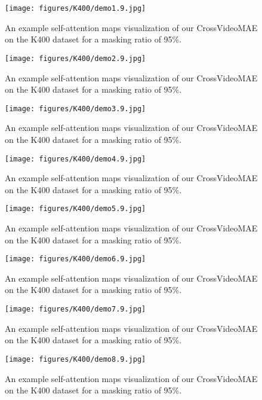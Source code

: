 \begin{figure}[h!]
\centering
\texttt{[image: figures/K400/demo1.9.jpg]}
\caption{An example self-attention maps visualization of our CrossVideoMAE on the K400 dataset for a masking ratio of 95\%.}
\label{fig:figure2}
\end{figure}

\begin{figure}[h!]
\centering
\texttt{[image: figures/K400/demo2.9.jpg]}
\caption{An example self-attention maps visualization of our CrossVideoMAE on the K400 dataset for a masking ratio of 95\%.}
\label{fig:figure3}
\end{figure}

\begin{figure}[h!]
\centering
\texttt{[image: figures/K400/demo3.9.jpg]}
\caption{An example self-attention maps visualization of our CrossVideoMAE on the K400 dataset for a masking ratio of 95\%.}
\label{fig:figure4}
\end{figure}

\begin{figure}[h!]
\centering
\texttt{[image: figures/K400/demo4.9.jpg]}
\caption{An example self-attention maps visualization of our CrossVideoMAE on the K400 dataset for a masking ratio of 95\%.}
\label{fig:figure5}
\end{figure}

\begin{figure}[h!]
\centering
\texttt{[image: figures/K400/demo5.9.jpg]}
\caption{An example self-attention maps visualization of our CrossVideoMAE on the K400 dataset for a masking ratio of 95\%.}
\label{fig:figure6}
\end{figure}

\begin{figure}[h!]
\centering
\texttt{[image: figures/K400/demo6.9.jpg]}
\caption{An example self-attention maps visualization of our CrossVideoMAE on the K400 dataset for a masking ratio of 95\%.}
\label{fig:figure7}
\end{figure}

\begin{figure}[h!]
\centering
\texttt{[image: figures/K400/demo7.9.jpg]}
\caption{An example self-attention maps visualization of our CrossVideoMAE on the K400 dataset for a masking ratio of 95\%.}
\label{fig:figure8}
\end{figure}

\begin{figure}[h!]
\centering
\texttt{[image: figures/K400/demo8.9.jpg]}
\caption{An example self-attention maps visualization of our CrossVideoMAE on the K400 dataset for a masking ratio of 95\%.}
\label{fig:figure9}
\end{figure}

